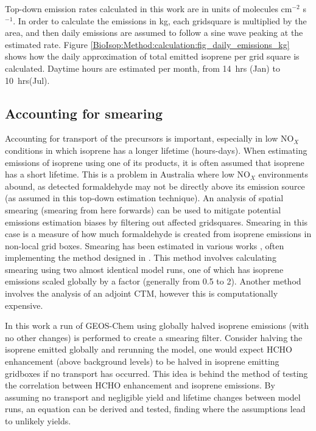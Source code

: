     Top-down emission rates calculated in this work are in units of molecules cm$^{-2}$ s$^{-1}$.
    In order to calculate the emissions in kg, each gridsquare is multiplied by the area, and then daily emissions are assumed to follow a sine wave peaking at the estimated rate.
    Figure \ref{BioIsop:Method:calculation:fig_daily_emissions_kg} shows how the daily approximation of total emitted isoprene per grid square is calculated. 
    Daytime hours are estimated per month, from 14~hrs (Jan) to 10~hrs(Jul).
    
    
  
  \subsection{Accounting for smearing}
    \label{BioIsop:Method:Smearing}
    
    Accounting for transport of the precursors is important, especially in low NO$_X$ conditions in which isoprene has a longer lifetime (hours-days).
    When estimating emissions of isoprene using one of its products, it is often assumed that isoprene has a short lifetime.
    This is a problem in Australia where low NO$_X$ environments abound, as detected formaldehyde may not be directly above its emission source (as assumed in this top-down estimation technique).
    An analysis of spatial smearing (smearing from here forwards) can be used to mitigate potential emissions estimation biases by filtering out affected gridsquares.
    Smearing in this case is a measure of how much formaldehyde is created from isoprene emissions in non-local grid boxes.
    Smearing has been estimated in various works \parencite[eg.][]{Martin2003, Palmer2003, Millet2006, Stavrakou2009, Marais2012, Barkley2013, Zhu2014, Wolfe2016, Surl2018}, often implementing the method designed in \textcite{Palmer2003}.
    This method involves calculating smearing using two almost identical model runs, one of which has isoprene emissions scaled globally by a factor (generally from 0.5 to 2).
    Another method \parencite[eg.][]{Stavrakou2009} involves the analysis of an adjoint CTM, however this is computationally expensive.
    
    In this work a run of GEOS-Chem using globally halved isoprene emissions (with no other changes) is performed to create a smearing filter.
    Consider halving the isoprene emitted globally and rerunning the model, one would expect HCHO enhancement (above background levels) to be halved in isoprene emitting gridboxes if no transport has occurred.
    This idea is behind the method of testing the correlation between HCHO enhancement and isoprene emissions.
    By assuming no transport and negligible yield and lifetime changes between model runs, an equation can be derived and tested, finding where the assumptions lead to unlikely yields.
    

